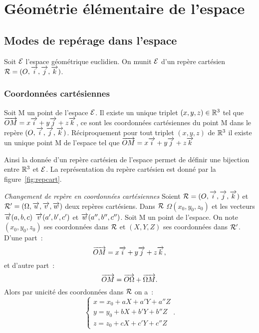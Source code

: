 \chapter{Géométrie élémentaire de l'espace}
\label{chap:geomEspace}
\minitoc
\minilof
\minilot
\section{Modes de repérage dans l'espace}
Soit \(\mathcal{E}\) l'espace géométrique euclidien. On munit \(\mathcal{E}\) d'un repère cartésien \(\mathcal{R}=(O,\overrightarrow{i},\overrightarrow{j},\overrightarrow{k})\).

\subsection{Coordonnées cartésiennes}
\begin{defdef}
  Soit M un point de l'espace \(\mathcal{E}\). Il existe un unique triplet \((x,y,z)\in\mathbb{R}^3\) tel que \(\overrightarrow{OM}=x\overrightarrow{i}+y\overrightarrow{j}+z\overrightarrow{k}\), ce sont les coordonnées cartésiennes du point M dans le repère \((O,\overrightarrow{i},\overrightarrow{j},\overrightarrow{k})\). Réciproquement pour tout triplet \((x,y,z)\) de \(\mathbb{R}^3\) il existe un unique point M de l'espace tel que \(\overrightarrow{OM}=x\overrightarrow{i}+y\overrightarrow{j}+z\overrightarrow{k}\)
\end{defdef}
Ainsi la donnée d'un repère cartésien de l'espace permet de définir une 
bijection entre \(\mathbb{R}^3\) et \(\mathcal{E}\). La représentation du repère cartésien est 
donné par la figure~\ref{fig:repcart}.

\emph{Changement de repère en coordonnées cartésiennes}
Soient \(\mathcal{R}=(O,\overrightarrow{i},\overrightarrow{j},\overrightarrow{k})\) et \(\mathcal{R}'=(\Omega,\overrightarrow{u},\overrightarrow{v},\overrightarrow{w})\) deux repères cartésiens. Dans \(\mathcal{R}\) \(\Omega(x_0,y_0,z_0)\) et les vecteurs \(\overrightarrow{u}(a,b,c)\) \(\overrightarrow{v}(a',b',c')\) et \(\overrightarrow{w}(a'',b'',c'')\). Soit M un point de l'espace. On note \((x_0,y_0,z_0)\) ses coordonnées dans \(\mathcal{R}\) et \((X,Y,Z)\) ses coordonnées dans \(\mathcal{R}'\). D'une part~:
\begin{equation}
  \overrightarrow{OM}=x\overrightarrow{i}+y\overrightarrow{j}+z\overrightarrow{k},
\end{equation}
et d'autre part~:
\begin{equation}
  \overrightarrow{OM}=\overrightarrow{O\Omega}+\overrightarrow{\Omega M}.
\end{equation}
Alors par unicité des coordonnées dans \(\mathcal{R}\) on a~:
\begin{equation}
  \begin{cases}
    x=x_0+aX+a'Y+a''Z\\
    y=y_0+bX+b'Y+b''Z\\
    z=z_0+cX+c'Y+c''Z
  \end{cases}.
\end{equation}

